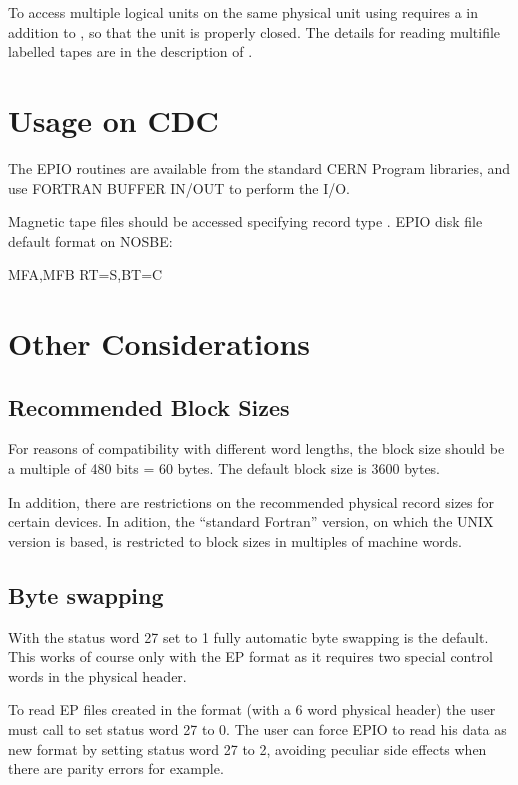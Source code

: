 To access multiple logical units on the same physical unit
using  requires a 
in addition to , so
that the unit is properly closed. The details for reading multifile
labelled tapes are in the description of .

\section{Usage on CDC}

The EPIO routines are available from the standard CERN Program
libraries, and use FORTRAN BUFFER IN/OUT to perform the I/O.
 
Magnetic tape files should be accessed specifying record type .
EPIO disk file default format on NOSBE:
\begin{XMP}
    MFA,MFB      RT=S,BT=C
\end{XMP}

\section{Other Considerations}

\subsection{Recommended Block Sizes}

For reasons of compatibility with different word lengths, the block size
should be a multiple of 480 bits = 60 bytes. The default block size
is 3600 bytes.
 
In addition, there are restrictions on the recommended physical
record sizes for certain devices. In adition,
the ``standard Fortran'' version, on which the UNIX version
is based, is restricted to block sizes in multiples of machine words.

\subsection{Byte swapping}

With the status word 27 set to 1 fully automatic byte swapping 
is the default.
This works of course only with the EP format as it requires
two special control words in the physical header.
 
To read EP files created in the  format (with a 6 word
physical header) the user must call  to set status
word 27 to 0.
The user can force EPIO to read his data as new
format by setting status word 27 to 2, avoiding peculiar side
effects when there are parity errors for example.

